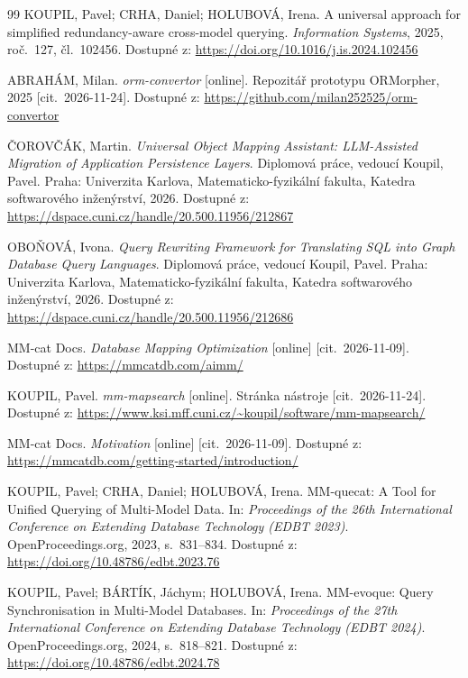 \begin{thebibliography}{99}
KOUPIL, Pavel; CRHA, Daniel; HOLUBOVÁ, Irena. A universal approach for simplified redundancy-aware cross-model querying. \emph{Information Systems}, 2025, roč.~127, čl.~102456. Dostupné z: \url{https://doi.org/10.1016/j.is.2024.102456}

ABRAHÁM, Milan. \emph{orm-convertor} [online]. Repozitář prototypu ORMorpher, 2025 [cit.~\mbox{2026-11-24}]. Dostupné z: \url{https://github.com/milan252525/orm-convertor}

ČOROVČÁK, Martin. \emph{Universal Object Mapping Assistant: LLM-Assisted Migration of Application Persistence Layers}. Diplomová práce, vedoucí Koupil, Pavel. Praha: Univerzita Karlova, Matematicko-fyzikální fakulta, Katedra softwarového inženýrství, 2026. Dostupné z: \url{https://dspace.cuni.cz/handle/20.500.11956/212867}

OBOŇOVÁ, Ivona. \emph{Query Rewriting Framework for Translating SQL into Graph Database Query Languages}. Diplomová práce, vedoucí Koupil, Pavel. Praha: Univerzita Karlova, Matematicko-fyzikální fakulta, Katedra softwarového inženýrství, 2026. Dostupné z: \url{https://dspace.cuni.cz/handle/20.500.11956/212686}

MM-cat Docs. \emph{Database Mapping Optimization} [online] [cit.~\mbox{2026-11-09}]. Dostupné z: \url{https://mmcatdb.com/aimm/}

KOUPIL, Pavel. \emph{mm-mapsearch} [online]. Stránka nástroje [cit.~\mbox{2026-11-24}]. Dostupné z: \url{https://www.ksi.mff.cuni.cz/~koupil/software/mm-mapsearch/}

MM-cat Docs. \emph{Motivation} [online] [cit.~\mbox{2026-11-09}]. Dostupné z: \url{https://mmcatdb.com/getting-started/introduction/}

KOUPIL, Pavel; CRHA, Daniel; HOLUBOVÁ, Irena. MM-quecat: A Tool for Unified Querying of Multi-Model Data. In: \emph{Proceedings of the 26th International Conference on Extending Database Technology (EDBT 2023)}. OpenProceedings.org, 2023, s.~831--834. Dostupné z: \url{https://doi.org/10.48786/edbt.2023.76}

KOUPIL, Pavel; BÁRTÍK, Jáchym; HOLUBOVÁ, Irena. MM-evoque: Query Synchronisation in Multi-Model Databases. In: \emph{Proceedings of the 27th International Conference on Extending Database Technology (EDBT 2024)}. OpenProceedings.org, 2024, s.~818--821. Dostupné z: \url{https://doi.org/10.48786/edbt.2024.78}


\end{thebibliography}
